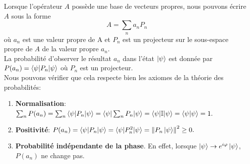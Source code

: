 \documentclass[../notesdecours.tex]{subfiles}
\begin{document}
\begin{center}
\end{center}
Lorsque l'opérateur $A$ possède une base de vecteurs propres, nous pouvons écrire $A$ sous la forme\begin{equation}
A = \sum_n a_nP_n
\end{equation}
où $a_n$ est une valeur propre de A et $P_n$ est un projecteur sur le sous-espace propre de $A$ de la valeur propre $a_n$.\\

La probabilité d'observer le résultat $a_n$ dans l'état $\ket{\psi}$ est donnée par $P(a_n) = \braket{\psi|P_n|\psi}$ où $P_n$ est un projecteur.\\

Nous pouvons vérifier que cela respecte bien les axiomes de la théorie des probabilités:
\begin{enumerate}
\item \textbf{Normalisation}: $\sum_n P(a_n) = \sum_n \braket{\psi|P_n|\psi} = \braket{\psi|\sum_n P_n|\psi} = \braket{\psi|\mathbb{I}|\psi} = \braket{\psi|\psi} = 1.$
\item \textbf{Positivité}: $P(a_n) = \braket{\psi|P_n|\psi} = \braket{\psi|P_n^2|\psi} = \norm{P_n\ket{\psi}}^2 \geq 0.$
\item \textbf{Probabilité indépendante de la phase}. En effet, lorsque $\ket{\psi}\to e^{i\varphi}\ket{\psi}$, $P(a_n)$ ne change pas.
\end{enumerate}
\end{document}
